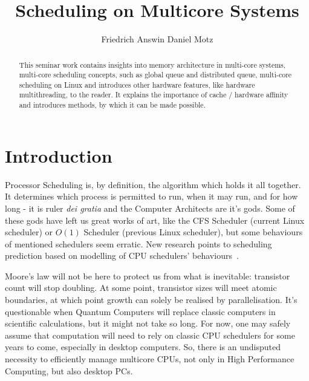 \documentclass[runningheads]{llncs}
\begin{document}
%
\title{Scheduling on Multicore Systems}
%
%
\author{Friedrich Answin Daniel Motz}
%
%
%
\maketitle              %
%
\begin{abstract}
This seminar work contains insights into memory architecture in multi-core systems, multi-core scheduling concepts, such as global queue and distributed queue, multi-core scheduling on Linux and introduces other hardware features, like hardware multithreading, to the reader. It explains the importance of cache / hardware affinity and introduces methods, by which it can be made possible.

\end{abstract}
%
%
%
\section{Introduction}
Processor Scheduling is, by definition, the algorithm which holds it all together. It determines which
process is permitted to run, when it may run, and for how long - it is ruler \textit{dei gratia}
and the Computer Architects are it's gods. Some of these gods have left us great works of art,
like the CFS Scheduler (current Linux scheduler) or $O(1)$ Scheduler (previous Linux scheduler), 
but some behaviours of mentioned schedulers seem erratic. New research points to scheduling prediction 
based on modelling of CPU schedulers' behaviours~\cite{meehean}.

Moore's law will not be here to protect us from what is inevitable: transistor count will stop
doubling. At some point, transistor sizes will meet atomic boundaries, at which point growth can
solely be realised by parallelisation. It's questionable when Quantum Computers
will replace classic computers in scientific calculations, but it might not take so long. For
now, one may safely assume that computation will need to rely on classic CPU schedulers for some
years to come, especially in desktop computers. So, there is an undisputed necessity to efficiently
manage multicore CPUs, not only in High Performance Computing, but also desktop PCs.~\cite{thread-sched-mc-platforms}
\end{document}
